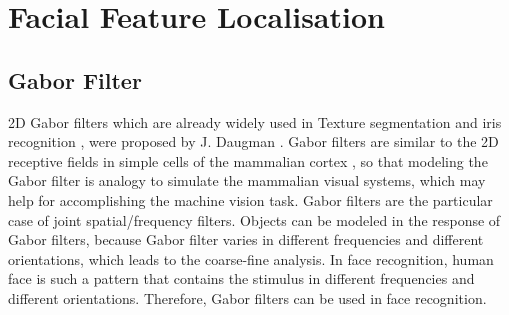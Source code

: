 \chapter{Facial Feature Localisation}
\section{Gabor Filter}
2D Gabor filters which are already widely used in Texture segmentation \cite{Dunn1995} and iris recognition \cite{Daugman1993}, were proposed by J. Daugman \cite{Daugman1985}. Gabor filters are similar to the 2D receptive fields in simple cells of the mammalian cortex \cite{Jones1987}, so that modeling the Gabor filter is analogy to simulate the mammalian visual systems, which may help for accomplishing the machine vision task. Gabor filters are the particular case of joint spatial/frequency filters. Objects can be modeled in the response of Gabor filters, because Gabor filter varies in different frequencies and different orientations, which leads to the coarse-fine analysis. In face recognition, human face is such a pattern that contains the stimulus in different frequencies and different orientations. Therefore, Gabor filters can be used in face recognition.

